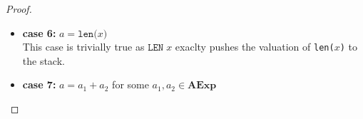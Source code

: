 \documentclass{article}
\begin{document}
\begin{proof}
\begin{itemize}
  Suppose $\mathit{LF}(lst; i_1, \dots, i_d)) = j$ for some $j \in \textbf{AExp}$ and assume for an induction on the correctness of the compilation of $j$. 

    \[
      \begin{aligned}
        \langle  \mathcal{CA}(a) : c,\, e,\, \sigma,\, s,\, pc \rangle 
        &= \langle \mathcal{CA}(lst\texttt{[$i_1$]}\dots\texttt{[$i_d$]}) : c,\, e,\, \sigma,\, s,\, pc \rangle \\
        &= \langle \mathcal{CA}(\mathit{LF}(lst; i_1, \dots, i_d)) : \texttt{LLOAD}\;lst : c,\, e,\, \sigma,\, s,\, pc \rangle 
        && \text{(definition of $\mathcal{CA}$)} \\
        &= \langle \mathcal{CA}(j) : \texttt{LLOAD}\;lst : c,\, e,\, \sigma,\, s,\, pc \rangle 
        && \text{(assumption)} \\
        &\triangleright^\ast \langle \texttt{LLOAD}\;lst : c,\, \mathcal{A}(j, \sigma, s):  e,\, \sigma,\, s,\, pc + l_j \rangle 
        && \text{(induction hypothesis)} \\
        &\triangleright \langle c,\, \sigma(lst\texttt{[$\mathcal{A}(j, \sigma, s)$]}, s):  e,\, \sigma,\, s,\, pc + l_j + 1 \rangle
        && \text{(operational semantics)} \\
        &= \langle c,\, \sigma(lst\texttt{[$\mathcal{A}(\mathit{LF}(lst\;; i_1, \dots, i_d), \sigma, s)$]}, s):  e,\, \sigma,\, s,\, pc + l_j + 1 \rangle
        && \text{(definition of $\mathit{LF}$)} \\
        &= \langle c,\, \mathcal{A}(lst\texttt{[$\mathcal{A}(i_1, \sigma, s)$]}\dots\texttt{[$\mathcal{A}(i_d, \sigma, s)$]}, \sigma, s) : e,\, \sigma,\, s,\, pc+1 \rangle 
        && \text{(list flattening)} \\
        &= \langle c,\, \mathcal{A}(lst\texttt{[$i_1$]}\dots\texttt{[$i_d$]}, \sigma, s) : e,\, \sigma,\, s,\, pc+1 \rangle
        && \text{(definition of $\mathcal{A}$)} \\
        &= \langle c,\, \mathcal{A}(a, \sigma, s) : e,\, \sigma,\, s,\, pc+1 \rangle \\
      \end{aligned}
  \]

    \item \textbf{case 6: } $a = \texttt{len($x$)}$ \\
    This case is trivially true as $\texttt{LEN}\;x$ exaclty pushes the valuation of \texttt{len($x$)} to the stack.

    \item \textbf{case 7: } $a = a_1 + a_2$ for some $a_1, a_2 \in \textbf{AExp}$ \\


\end{itemize}
\end{proof}
\end{document}
